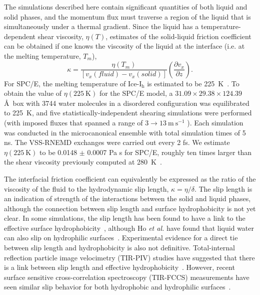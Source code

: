 \documentclass{pnastwo}
\begin{document}
\begin{article}
The simulations described here contain significant quantities of both
liquid and solid phases, and the momentum flux must traverse a region
of the liquid that is simultaneously under a thermal gradient.  Since
the liquid has a temperature-dependent shear viscosity, $\eta(T)$,
estimates of the solid-liquid friction coefficient can be obtained if
one knows the viscosity of the liquid at the interface (i.e. at the
melting temperature, $T_m$),
\begin{equation}\label{kappa-2}
\kappa = \frac{\eta(T_{m})}{\left[v_{x}(fluid)-v_{x}(solid)\right]}\left(\frac{\partial v_{x}}{\partial z}\right).
\end{equation}
For SPC/E, the melting temperature of Ice-I$_\mathrm{h}$ is estimated
to be 225~K~\cite{Bryk02}.  To obtain the value of
$\eta(225\mathrm{~K})$ for the SPC/E model, a $31.09 \times 29.38
\times 124.39$ \AA\ box with 3744 water molecules in a disordered
configuration was equilibrated to 225~K, and five
statistically-independent shearing simulations were performed (with
imposed fluxes that spanned a range of $3 \rightarrow 13
\mathrm{~m~s}^{-1}$ ).  Each simulation was conducted in the
microcanonical ensemble with total simulation times of 5 ns. The
VSS-RNEMD exchanges were carried out every 2 fs. We estimate
$\eta(225\mathrm{~K})$ to be 0.0148 $\pm$ 0.0007 Pa s for SPC/E,
roughly ten times larger than the shear viscosity previously computed
at 280~K~\cite{Kuang12}.

The interfacial friction coefficient can equivalently be expressed as
the ratio of the viscosity of the fluid to the hydrodynamic slip
length, $\kappa = \eta / \delta$. The slip length is an indication of
strength of the interactions between the solid and liquid phases,
although the connection between slip length and surface hydrophobicity
is not yet clear. In some simulations, the slip length has been found
to have a link to the effective surface
hydrophobicity~\cite{Sendner:2009uq}, although Ho \textit{et al.} have
found that liquid water can also slip on hydrophilic
surfaces~\cite{Ho:2011zr}. Experimental evidence for a direct tie
between slip length and hydrophobicity is also not
definitive. Total-internal reflection particle image velocimetry
(TIR-PIV) studies have suggested that there is a link between slip
length and effective
hydrophobicity~\cite{Lasne:2008vn,Bouzigues:2008ys}. However, recent
surface sensitive cross-correlation spectroscopy (TIR-FCCS)
measurements have seen similar slip behavior for both hydrophobic and
hydrophilic surfaces~\cite{Schaeffel:2013kx}.


\end{article}
\end{document}
